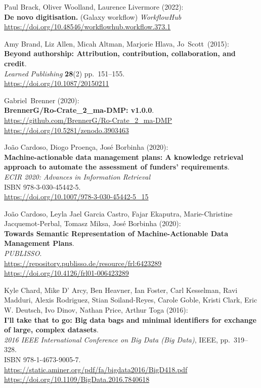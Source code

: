 \begin{thebibliography}{9}
Paul Brack, Oliver Woolland, Laurence Livermore
(2022):\\
\textbf{De novo digitisation.} (Galaxy workflow) \emph{WorkflowHub}\\
\url{https://doi.org/10.48546/workflowhub.workflow.373.1}

Amy Brand, Liz Allen, Micah Altman, Marjorie Hlava, Jo~Scott~(2015):\\
\textbf{Beyond authorship: Attribution, contribution, collaboration, and
credit}.\\
\emph{Learned Publishing} \textbf{28}(2) pp.~151--155.\\
\url{https://doi.org/10.1087/20150211}

Gabriel~Brenner (2020):\\
\textbf{BrennerG/Ro-Crate\_2\_ma-DMP: v1.0.0}.\\
\url{https://github.com/BrennerG/Ro-Crate_2_ma-DMP}\\
\url{https://doi.org/10.5281/zenodo.3903463}

João Cardoso, Diogo Proença, José Borbinha (2020):\\
\textbf{Machine-actionable data management plans: A knowledge retrieval
approach to automate the assessment of funders' requirements}.\\
\emph{ECIR 2020: Advances in Information Retrieval}\\
ISBN 978-3-030-45442-5.\\
\url{https://doi.org/10.1007/978-3-030-45442-5_15}

João Cardoso, Leyla Jael Garcia Castro, Fajar Ekaputra, Marie-Christine Jacquemot-Perbal, Tomasz Miksa, José Borbinha (2020):\\
\textbf{Towards Semantic Representation of Machine-Actionable Data
Management Plans}.\\
\emph{PUBLISSO}.\\
\url{https://repository.publisso.de/resource/frl:6423289}\\
\url{https://doi.org/10.4126/frl01-006423289}

Kyle Chard, Mike D' Arcy, Ben Heavner, Ian Foster, Carl
Kesselman, Ravi Madduri, Alexis Rodriguez, Stian Soiland-Reyes, Carole
Goble, Kristi Clark, Eric W. Deutsch, Ivo Dinov, Nathan Price, Arthur
Toga (2016):\\
\textbf{I'll take that to go: Big data bags and minimal identifiers for
exchange of large, complex datasets}.\\
\emph{2016 IEEE International Conference on Big Data (Big Data)}, IEEE,
pp.~319--328.\\
ISBN 978-1-4673-9005-7.\\
\url{https://static.aminer.org/pdf/fa/bigdata2016/BigD418.pdf}\\
\url{https://doi.org/10.1109/BigData.2016.7840618}


\end{thebibliography}
